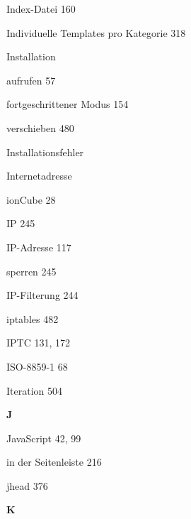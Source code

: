 \documentclass{book}
\renewcommand\indexspace{\vspace{11pt}}
\renewcommand\subitem{\par}
\begin{document}
\begin{multicols}{2}
\begin{osp-index}
  \item Index-Datei\hspace{1mm} 160
  \item Individuelle Templates pro Kategorie\hspace{1mm} 318
  \item Installation\hspace{1mm} 
    \subitem aufrufen\hspace{1mm} 57
    \subitem fortgeschrittener Modus\hspace{1mm} 154
    \subitem verschieben\hspace{1mm} 480
  \item Installationsfehler\hspace{1mm} 
  \item Internetadresse\hspace{1mm} 
  \item ionCube\hspace{1mm} 28
  \item IP\hspace{1mm} 245
  \item IP-Adresse\hspace{1mm} 117
    \subitem sperren\hspace{1mm} 245
  \item IP-Filterung\hspace{1mm} 244
  \item iptables\hspace{1mm} 482
  \item IPTC\hspace{1mm} 131, 172
  \item ISO-8859-1\hspace{1mm} 68
  \item Iteration\hspace{1mm} 504

  \indexspace
{\sffamily\bfseries J}\nopagebreak

  \item JavaScript\hspace{1mm} 42, 99
    \subitem in der Seitenleiste\hspace{1mm} 216
  \item jhead\hspace{1mm} 376

  \indexspace
{\sffamily\bfseries K}\nopagebreak


\end{osp-index}
\end{multicols}
\end{document}
